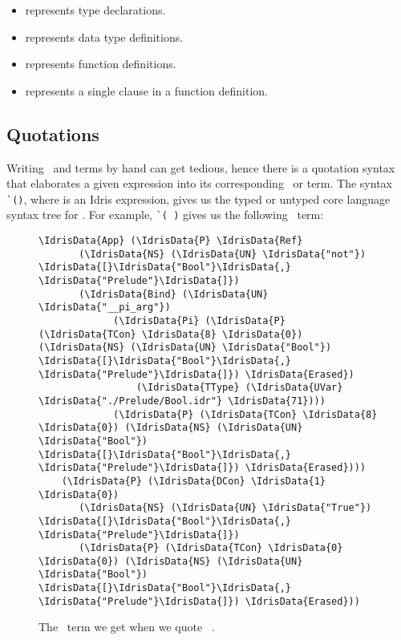 \begin{itemize}
\item{} represents type declarations.
\item{} represents data type definitions.
\item{} represents function definitions.
\item{} represents a single clause in a function definition.
\end{itemize}

\subsection{Quotations}\label{ssec:quotation}

Writing \TT\ and  terms by hand can get tedious, hence there is a
quotation syntax that elaborates a given expression into its corresponding
\TT\ or  term.\cite{idrisQuotation}
The syntax \texttt{\`{}()}, where  is an Idris expression, gives
us the typed or untyped core language syntax tree for . For example,
\texttt{\`{}( )} gives us the following \TT\ term:

\begin{figure}[ht]
  \caption{The \TT\ term we get when we quote \texttt{ }.}
\begin{Verbatim}[framesep=2mm, label=\footnotesize{\normalfont{Idris}}, labelposition=topline]
\IdrisData{App} (\IdrisData{P} \IdrisData{Ref}
       (\IdrisData{NS} (\IdrisData{UN} \IdrisData{"not"}) \IdrisData{[}\IdrisData{"Bool"}\IdrisData{,} \IdrisData{"Prelude"}\IdrisData{]})
       (\IdrisData{Bind} (\IdrisData{UN} \IdrisData{"__pi_arg"})
             (\IdrisData{Pi} (\IdrisData{P} (\IdrisData{TCon} \IdrisData{8} \IdrisData{0}) (\IdrisData{NS} (\IdrisData{UN} \IdrisData{"Bool"}) \IdrisData{[}\IdrisData{"Bool"}\IdrisData{,} \IdrisData{"Prelude"}\IdrisData{]}) \IdrisData{Erased})
                 (\IdrisData{TType} (\IdrisData{UVar} \IdrisData{"./Prelude/Bool.idr"} \IdrisData{71})))
             (\IdrisData{P} (\IdrisData{TCon} \IdrisData{8} \IdrisData{0}) (\IdrisData{NS} (\IdrisData{UN} \IdrisData{"Bool"}) \IdrisData{[}\IdrisData{"Bool"}\IdrisData{,} \IdrisData{"Prelude"}\IdrisData{]}) \IdrisData{Erased})))
    (\IdrisData{P} (\IdrisData{DCon} \IdrisData{1} \IdrisData{0})
       (\IdrisData{NS} (\IdrisData{UN} \IdrisData{"True"}) \IdrisData{[}\IdrisData{"Bool"}\IdrisData{,} \IdrisData{"Prelude"}\IdrisData{]})
       (\IdrisData{P} (\IdrisData{TCon} \IdrisData{0} \IdrisData{0}) (\IdrisData{NS} (\IdrisData{UN} \IdrisData{"Bool"}) \IdrisData{[}\IdrisData{"Bool"}\IdrisData{,} \IdrisData{"Prelude"}\IdrisData{]}) \IdrisData{Erased}))
\end{Verbatim}
\end{figure}

